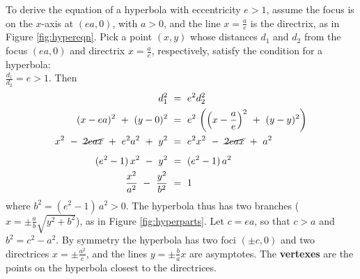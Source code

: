 \piccaption[]{\label{fig:hypereqn}}
To derive the equation of a hyperbola with eccentricity $e>1$, assume the focus
is on the $x$-axis at $(ea,0)$, with $a>0$, and the line $x=\frac{a}{e}$ is the
directrix, as in Figure \ref{fig:hypereqn}. Pick a point $(x,y)$ whose distances
$d_1$ and $d_2$ from the focus $(ea,0)$ and directrix $x=\frac{a}{e}$,
respectively, satisfy the condition for a hyperbola:\\$\frac{d_1}{d_2}=e>1$.
Then
\begin{align*}
d_1^2 ~&=~ e^2 d_2^2\\
(x-ea)^2 ~+~ (y-0)^2 ~&=~ e^2\,\left(\left(x-\frac{a}{e}\right)^2 ~+~ (y-y)^2\right)\\
x^2 ~-~ \cancel{2eax} ~+~ e^2a^2 ~+~ y^2 ~&=~ e^2x^2 ~-~ \cancel{2eax} ~+~ a^2\\[4pt]
(e^2 - 1)\,x^2 ~-~ y^2 ~&=~ (e^2 - 1)\,a^2\\
\frac{x^2}{a^2} ~-~ \frac{y^2}{b^2} ~&=~ 1
\end{align*}\vspace{-8mm}
\noindent where $b^2 = (e^2 - 1)\,a^2 > 0$. The
hyperbola thus has two branches ($x=\pm \frac{a}{b}\sqrt{y^2 + b^2}$), as
in Figure \ref{fig:hyperparts}. Let $c=ea$, so that $c>a$ and $b^2 = c^2-a^2$.
By symmetry the hyperbola has two foci $(\pm c,0)$ and two directrices
$x=\pm\frac{a^2}{c}$, and the lines $y=\pm \frac{b}{a}x$ are
asymptotes.
The \textbf{vertexes} are the points on the
hyperbola closest to the directrices.
